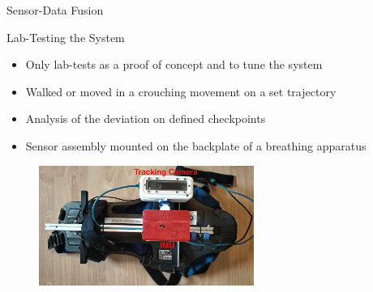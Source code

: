 \documentclass[aspectratio=169]{beamer}
\begin{document}
{\begin{frame}{Sensor-Data Fusion}
	\end{frame}
	
	\begin{frame}{Lab-Testing the System}
		\begin{itemize}
			\item Only lab-tests as a proof of concept and to tune the system
			\item Walked or moved in a crouching movement on a set trajectory
			\item Analysis of the deviation on defined checkpoints
			\item Sensor assembly mounted on the backplate of a breathing apparatus
		\end{itemize}
		\begin{figure}
			\centering
			\includegraphics[width=7cm]{../Conference_Paper/Assembly.jpg}
		\end{figure}
		
	\end{frame}
	
}
\end{document}
